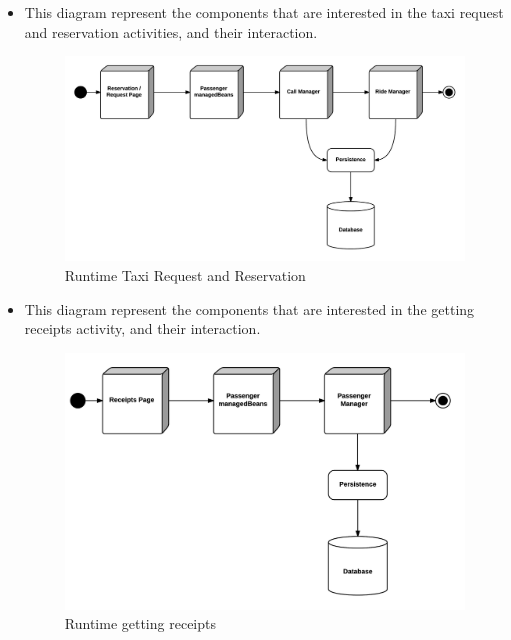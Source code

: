 \begin{itemize}
	\item This diagram represent the components that are interested in the taxi request and reservation activities, and their interaction.
	\begin{figure}[htbp]
	\centering
	\includegraphics[width=\textwidth]{cpt/img/RuntimeReqResView}
	\caption{Runtime Taxi Request and Reservation}
	\end{figure}
	\clearpage
	
	\item This diagram represent the components that are interested in the getting receipts activity, and their interaction.
	\begin{figure}[htbp]
	\centering
	\includegraphics[width=\textwidth]{cpt/img/RuntimeReceiptsView}
	\caption{Runtime getting receipts}
	\end{figure}
	\clearpage
	

\end{itemize}

